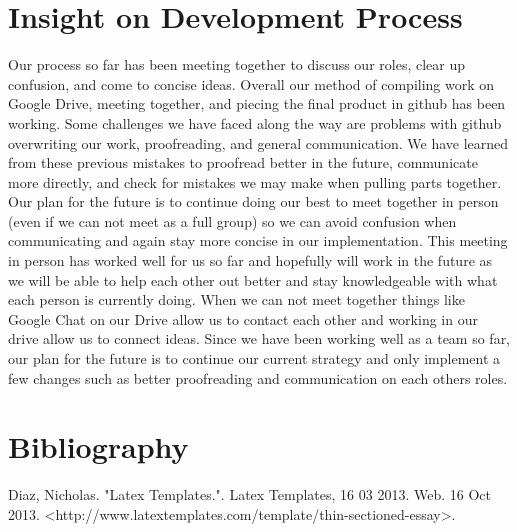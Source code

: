 \documentclass[a4paper, 11pt]{article} %
\begin{document}

\section*{Insight on Development Process}

Our process so far has been meeting together to discuss our roles, clear up confusion, and come to concise ideas. Overall our method of compiling work on Google Drive, meeting together, and piecing the final product in github has been working. Some challenges we have faced along the way are problems with github overwriting our work, proofreading, and general communication. We have learned from these previous mistakes to proofread better in the future, communicate more directly, and check for mistakes we may make when pulling parts together. Our plan for the future is to continue doing our best to meet together in person (even if we can not meet as a full group) so we can avoid confusion when communicating and again stay more concise in our implementation. This meeting in person has worked well for us so far and hopefully will work in the future as we will be able to help each other out better and stay knowledgeable with what each person is currently doing. When we can not meet together things like Google Chat on our Drive allow us to contact each other and working in our drive allow us to connect ideas. Since we have been working well as a team so far, our plan for the future is to continue our current strategy and only implement a few changes such as better proofreading and communication on each others roles.




\section*{Bibliography}

Diaz, Nicholas. "Latex Templates.". Latex Templates, 16 03 2013. Web. 16 Oct 2013. <http://www.latextemplates.com/template/thin-sectioned-essay>.

\end{document}
